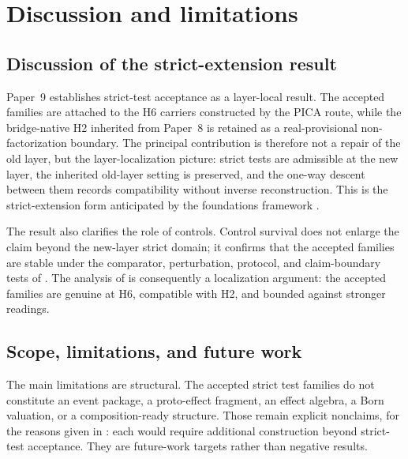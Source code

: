 \documentclass[11pt]{article}
\newcommand{\OldLayer}{H2}
\newcommand{\NewLayer}{H6}
\newcommand{\PaperNine}{Paper~9}
\newcommand{\PaperEight}{Paper~8}
\theoremstyle{definition}
\begin{document}
 \section{Discussion and limitations}\label{sec:discussion}

\subsection{Discussion of the strict-extension result}\label{subsec:discussion-strict-extension}

\PaperNine{} establishes strict-test acceptance as a layer-local result.  The
accepted families are attached to the \NewLayer{} carriers constructed by the
PICA route, while the bridge-native \OldLayer{} inherited from \PaperEight{}
\cite{Tsiokos2026CarrierToEvent} is retained as a real-provisional
non-factorization boundary.  The principal contribution is therefore not a
repair of the old layer, but the layer-localization picture: strict tests are
admissible at the new layer, the inherited old-layer setting is preserved, and
the one-way descent between them records compatibility without inverse
reconstruction.  This is the strict-extension form anticipated by the
foundations framework \cite{Tsiokos2026FoundationsII}.

The result also clarifies the role of controls.  Control survival does not
enlarge the claim beyond the new-layer strict domain; it confirms that the
accepted families are stable under the comparator, perturbation, protocol, and
claim-boundary tests of .  The analysis of
 is consequently a localization argument: the accepted
families are genuine at \NewLayer{}, compatible with \OldLayer{}, and bounded
against stronger readings.

\subsection{Scope, limitations, and future work}\label{subsec:discussion-scope-limitations}

The main limitations are structural.  The accepted strict test families do not
constitute an event package, a proto-effect fragment, an effect algebra, a Born
valuation, or a composition-ready structure.  Those remain explicit nonclaims,
for the reasons given in
:
each would require additional construction beyond strict-test acceptance.
They are future-work targets rather than negative results.
\end{document}
